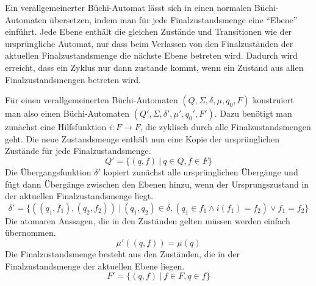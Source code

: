 Ein verallgemeinerter Büchi-Automat lässt sich in einen normalen Büchi-Automaten übersetzen, indem man für jede Finalzustandsmenge eine "`Ebene"' einführt.
Jede Ebene enthält die gleichen Zustände und Transitionen wie der ursprüngliche Automat, nur dass beim Verlassen von den Finalzuständen der aktuellen Finalzustandsmenge die nächste Ebene betreten wird.
Dadurch wird erreicht, dass ein Zyklus nur dann zustande kommt, wenn ein Zustand aus allen Finalzustandsmengen betreten wird.

Für einen verallgemeinerten Büchi-Automaten $(Q,\Sigma,\delta,\mu,q_0,F)$ konstruiert man also einen Büchi-Automaten $(Q',\Sigma,\delta',\mu',q_0',F')$.
Dazu benötigt man zunächst eine Hilfsfunktion $i : F\rightarrow F$, die zyklisch durch alle Finalzustandsmengen geht.
Die neue Zustandsmenge enthält nun eine Kopie der ursprünglichen Zustände für jede Finalzustandsmenge.
\[ Q' = \{ (q,f)\ |\ q\in Q, f\in F \} \]
Die Übergangsfunktion $\delta'$ kopiert zunächst alle ursprünglichen Übergänge und fügt dann Übergänge zwischen den Ebenen hinzu, wenn der Ursprungszustand in der aktuellen Finalzustandsmenge liegt.
\[ \delta' = \{ ((q_1,f_1),(q_2,f_2))\ |\ (q_1,q_2)\in\delta, (q_1\in f_1\land i(f_1)=f_2)\lor f_1=f_2\} \]
Die atomaren Aussagen, die in den Zuständen gelten müssen werden einfach übernommen.
\[ \mu'((q,f)) = \mu(q) \]
Die Finalzustandsmenge besteht aus den Zuständen, die in der Finalzustandsmenge der aktuellen Ebene liegen.
\[  F' = \{ (q,f)\ |\ f\in F, q\in f \} \]